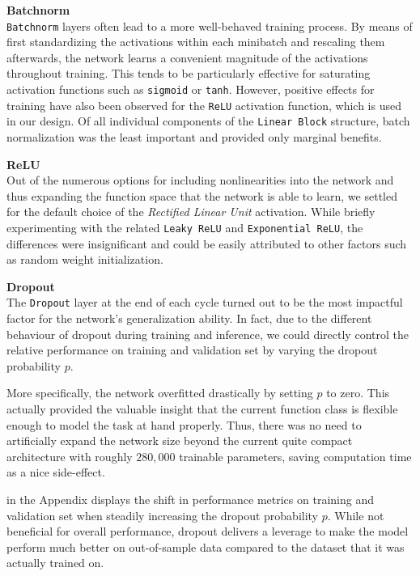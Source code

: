 \textbf{Batchnorm} \\
\texttt{Batchnorm} layers \citep{ioffe2015} often lead to a more well-behaved training process.
By means of first standardizing the activations within each minibatch and rescaling them afterwards, the network learns a convenient magnitude of the activations throughout training.
This tends to be particularly effective for saturating activation functions such as \texttt{sigmoid} or \texttt{tanh}. However, positive effects for training have also been observed for the \texttt{ReLU} activation function, which is used in our design.
Of all individual components of the \texttt{Linear Block} structure, batch normalization was the least important and provided only marginal benefits.

\textbf{ReLU} \\
Out of the numerous options for including nonlinearities into the network and thus expanding the function space that the network is able to learn, we settled for the default choice of the \emph{Rectified Linear Unit} activation.
While briefly experimenting with the related \texttt{Leaky ReLU} and \texttt{Exponential ReLU}, the differences were insignificant and could be easily attributed to other factors such as random weight initialization.

\textbf{Dropout} \label{dropout} \\ 
The \texttt{Dropout} layer \citep{srivastava2014} at the end of each cycle turned out to be the most impactful factor for the network's generalization ability.
In fact, due to the different behaviour of dropout during training and inference, we could directly control the relative performance on training and validation set by varying the dropout probability $p$.

More specifically, the network overfitted drastically by setting $p$ to zero.
This actually provided the valuable insight that the current function class is flexible enough to model the task at hand properly.
Thus, there was no need to artificially expand the network size beyond the current quite compact architecture with roughly $280,000$ trainable parameters, saving computation time as a nice side-effect.

 in the Appendix displays the shift in performance metrics on training and validation set when steadily increasing the dropout probability $p$.
While not beneficial for overall performance, dropout delivers a leverage to make the model perform much better on out-of-sample data compared to the dataset that it was actually trained on.

